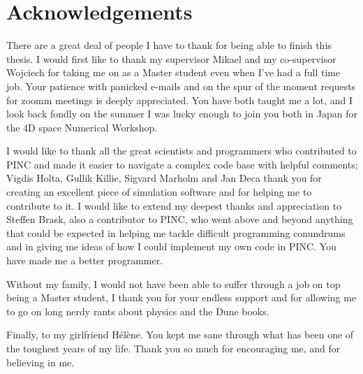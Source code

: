 \chapter{Acknowledgements}
There are a great deal of people I have to thank for being able to finish this thesis. I would first like to thank my supervisor Mikael and my co-supervisor Wojciech for taking me on as a Master student even when I've had a full time job. Your patience with panicked e-mails and on the spur of the moment requests for zoomm meetings is deeply appreciated. You have both taught me a lot, and I look back fondly on the summer I was lucky enough to join you both in Japan for the 4D space Numerical Workshop.

I would like to thank all the great scientists and programmers who contributed to PINC and made it easier to navigate a complex code base with helpful comments; Vigdis Holta, Gullik Killie, Sigvard Marholm and Jan Deca thank you for creating an excellent piece of simulation software and for helping me to contribute to it. I would like to extend my deepest thanks and appreciation to Steffen Brask, also a contributor to PINC, who went above and beyond anything that could be expected in helping me tackle difficult programming conundrums and in giving me ideas of how I could implement my own code in PINC. You have made me a better programmer.

Without my family, I would not have been able to suffer through a job on top being a Master student, I thank you for your endless support and for allowing me to go on long nerdy rants about physics and the Dune books. 

Finally, to my girlfriend Hélène. You kept me sane through what has been one of the toughest years of my life. Thank you so much for encouraging me, and for believing in me. 